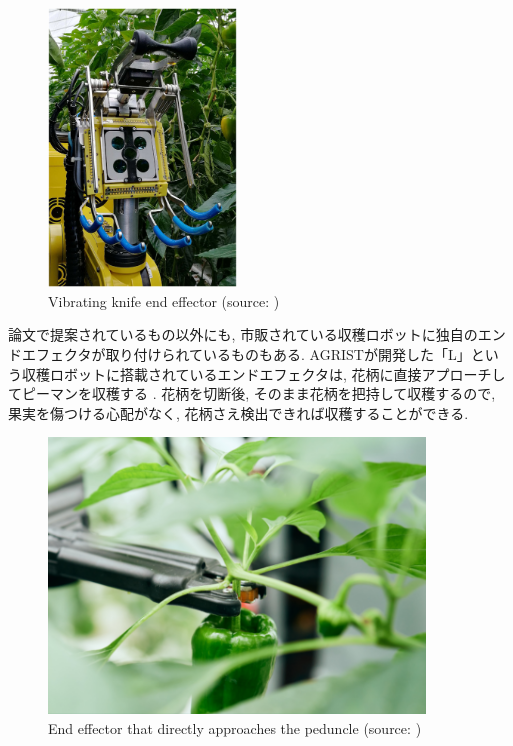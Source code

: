 \vspace{5mm}
\begin{figure}[H]
     \centering
     \includegraphics[width=50mm]{images/png/sweeper.png}
     \caption[Vibrating knife end effector]{Vibrating knife end effector (source: \cite{sweeper})}
     \label{Fig:sweeper}
\end{figure}

論文で提案されているもの以外にも, 市販されている収穫ロボットに独自のエンドエフェクタが取り付けられているものもある.
AGRISTが開発した「L」という収穫ロボットに搭載されているエンドエフェクタは, 花柄に直接アプローチしてピーマンを収穫する \cite{agrist}.
花柄を切断後, そのまま花柄を把持して収穫するので, 果実を傷つける心配がなく, 花柄さえ検出できれば収穫することができる.

\vspace{5mm}
\begin{figure}[H]
     \centering
     \includegraphics[width=100mm]{images/png/agrist.png}
     \caption[End effector that directly approaches the peduncle]{End effector that directly approaches the peduncle (source: \cite{agrist})}
     \label{Fig:agrist}
\end{figure}

